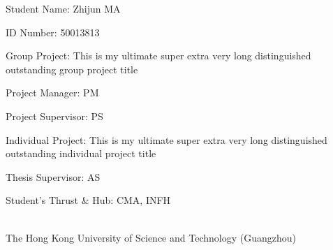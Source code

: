 \newpage

\thispagestyle{empty}
\null\vskip0.5in
\begin{center}
  \begin{LARGE}
    \thesistitle
  \end{LARGE}
  \vfill
\end{center}

    
\begin{large}
Student Name: 
Zhijun MA
\vspace{3mm}

ID Number: 
50013813 
\vspace{3mm}

Group Project: 
This is my ultimate super extra very long distinguished outstanding group project title
\vspace{3mm}

Project Manager: 
PM
\vspace{3mm}

Project Supervisor: 
PS
\vspace{3mm}

Individual Project: 
This is my ultimate super extra very long distinguished outstanding individual project title
\vspace{3mm}

Thesis Supervisor: 
AS
\vspace{3mm}

Student's Thrust \& Hub: 
CMA, INFH
    
\end{large}

\vfill
\begin{center}
  \thesisdate\\
  The Hong Kong University of Science and Technology (Guangzhou)
\end{center}
